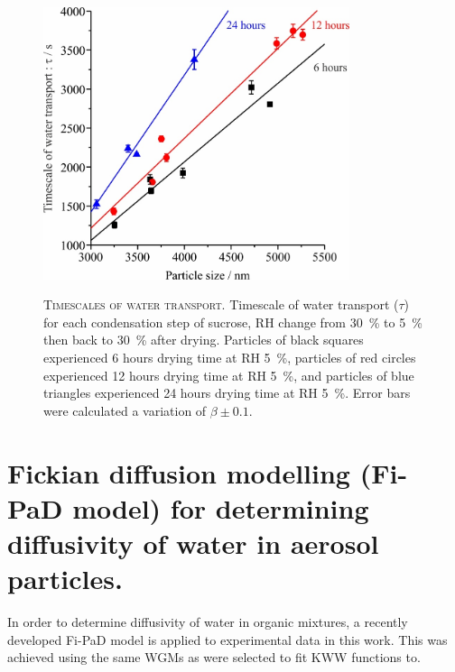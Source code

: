 \begin{figure}
    \centering
    \caption[Timescales of water transport]{\textsc{Timescales of water transport}. Timescale of water transport ($\tau$) for each condensation step of sucrose, RH change from \SI{30}{\percent} to \SI{5}{\percent} then back to \SI{30}{\percent} after drying. Particles of black squares experienced \num{6} hours drying time at RH \SI{5}{\percent}, particles of red circles experienced \num{12} hours drying time at RH \SI{5}{\percent}, and particles of blue triangles experienced \num{24} hours drying time at RH \SI{5}{\percent}. Error bars were calculated a variation of $\beta \pm \num{0.1}$.}
    \includegraphics[width=0.8\textwidth]{chapters/water_hopping/figures/image006.jpg}
    \label{fig:wat_s4}
\end{figure}

\section{Fickian diffusion modelling (Fi-PaD model) for determining diffusivity of water in aerosol particles.}

In order to determine diffusivity of water in organic mixtures, a recently developed Fi-PaD model is applied to experimental data in this work. This was achieved using the same WGMs as were selected to fit KWW functions to.

